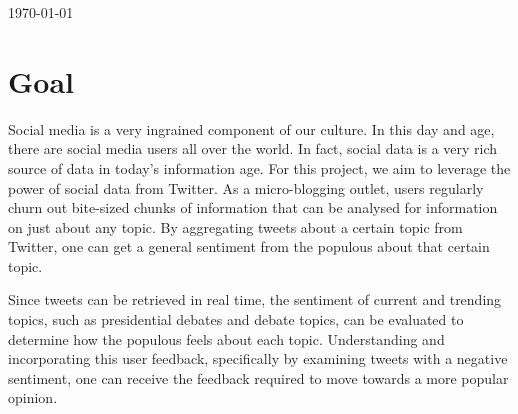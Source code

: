 \begin{titlepage}


{\large \today}\\[3cm] %


 

\vfill %

\end{titlepage}

\section{Goal}
Social media is a very ingrained component of our culture. In this day and age, there are social media users all over the world. In fact, social data is a very rich source of data in today’s information age. For this project, we aim to leverage the power of social data from Twitter. As a micro-blogging outlet, users regularly churn out bite-sized chunks of information that can be analysed for information on just about any topic. By aggregating tweets about a certain topic from Twitter, one can get a general sentiment from the populous about that certain topic. 

Since tweets can be retrieved in real time, the sentiment of current and trending topics, such as presidential debates and debate topics, can be evaluated to determine how the populous feels about each topic. Understanding and incorporating this user feedback, specifically by examining tweets with a negative sentiment, one can receive the feedback required to move towards a more popular opinion.

